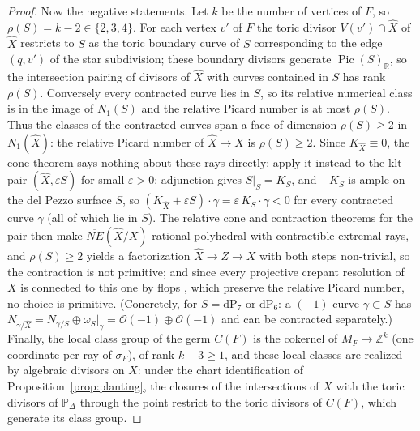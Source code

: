 \documentclass[11pt]{amsart}
\theoremstyle{definition}
\theoremstyle{remark}
\newcommand{\ZZ}{\mathbb{Z}}
\newcommand{\PP}{\mathbb{P}}
\begin{document}
\begin{proof}
Now the negative statements.  Let $k$ be the number of vertices of $F$,
so $\rho(S) = k-2 \in \{2,3,4\}$.  For each vertex $v'$ of $F$ the
toric divisor $V(v') \cap \widehat X$ of $\widehat X$ restricts to
$S$ as the toric boundary curve of $S$ corresponding to the edge
$(q,v')$ of the star subdivision; these boundary divisors generate
$\operatorname{Pic}(S)_{\mathbb{R}}$, so the intersection pairing of
divisors of $\widehat X$ with curves contained in $S$ has rank
$\rho(S)$.  Conversely every contracted curve lies in $S$, so its
relative numerical class is in the image of $N_1(S)$ and the relative
Picard number is at most $\rho(S)$.  Thus the classes of the contracted
curves span a face of dimension $\rho(S) \ge 2$ in $N_1(\widehat X)$:
the relative Picard number of $\widehat X \to X$ is $\rho(S) \ge 2$.  Since
$K_{\widehat X} \equiv 0$, the cone theorem says nothing about these
rays directly; apply it instead to the klt pair $(\widehat X,
\varepsilon S)$ for small $\varepsilon > 0$: adjunction gives
$S|_S = K_S$, and $-K_S$ is ample on the del Pezzo surface $S$, so
$(K_{\widehat X} + \varepsilon S)\cdot\gamma = \varepsilon\,
K_S\cdot\gamma < 0$ for every contracted curve $\gamma$ (all of which
lie in $S$).  The relative cone and contraction theorems for the pair
then make $\overline{NE}(\widehat X/X)$ rational polyhedral with
contractible extremal rays, and $\rho(S) \ge 2$ yields a factorization
$\widehat X \to Z \to X$ with both steps non-trivial, so the
contraction is not primitive; and since every
projective crepant resolution of $X$ is connected to this one by flops
\cite{Kawamata08}, which preserve the relative Picard number, no choice
is primitive.
(Concretely, for $S = \mathrm{dP}_7$ or $\mathrm{dP}_6$: a
$(-1)$-curve $\gamma \subset S$ has
$N_{\gamma/\widehat X} = N_{\gamma/S}\oplus\omega_S|_\gamma =
\mathcal{O}(-1)\oplus\mathcal{O}(-1)$ and can be contracted separately.)
Finally, the local class group of the germ $C(F)$ is the cokernel of
$M_F \to \ZZ^{k}$ (one coordinate per ray of $\sigma_F$), of rank
$k - 3 \ge 1$, and these local classes are realized by algebraic
divisors on $X$: under the chart identification of
Proposition~\ref{prop:planting}, the closures of the intersections of $X$ with the toric
divisors of $\PP_\Delta$ through the point restrict to the toric
divisors of $C(F)$, which generate its class group.


\end{proof}
\end{document}
